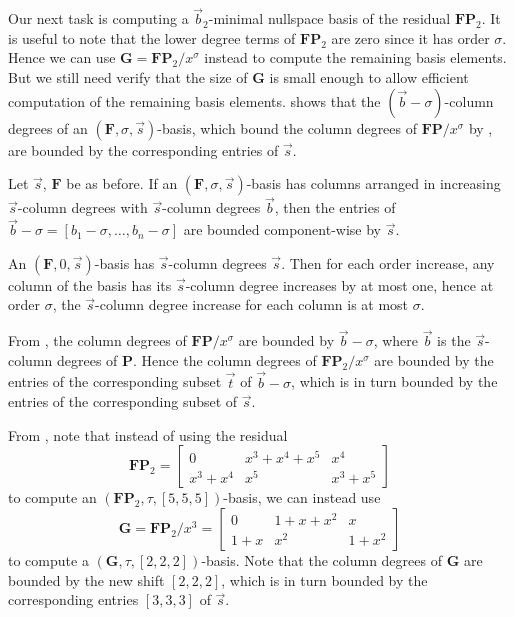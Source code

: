 Our next task is computing a $\vec{b}_{2}$-minimal nullspace basis
of the residual $\mathbf{F}\mathbf{P}_{2}$. It is useful to note
that the lower degree terms of $\mathbf{F}\mathbf{P}_{2}$ are zero
since it has order $\sigma$. Hence we can use $\mathbf{G}=\mathbf{F}\mathbf{P}_{2}/x^{\sigma}$
instead to compute the remaining basis elements. But we still need
verify that the size of $\mathbf{G}$ is small enough to allow efficient
computation of the remaining basis elements. 
shows that the $\left(\vec{b}-\sigma\right)$-column degrees of an
$(\mathbf{F},\sigma,\vec{s})$-basis, which bound the column degrees
of $\mathbf{F}\mathbf{P}/x^{\sigma}$ by ,
are bounded by the corresponding entries of $\vec{s}$.
\begin{lem}
\label{lem:boundOnShiftedDegrees}Let $\vec{s}$, $\mathbf{F}$ be
as before. If an $(\mathbf{F},\sigma,\vec{s})$-basis has columns
arranged in increasing $\vec{s}$-column degrees with $\vec{s}$-column
degrees $\vec{b}$, then the entries of $\vec{b}-\sigma=\left[b_{1}-\sigma,\dots,b_{n}-\sigma\right]$
are bounded component-wise by $\vec{s}$.\end{lem}
\begin{pf}
An $(\mathbf{F},0,\vec{s})$-basis has $\vec{s}$-column degrees $\vec{s}$.
Then for each order increase, any column of the basis has its $\vec{s}$-column
degree increases by at most one, hence at order $\sigma$, the $\vec{s}$-column
degree increase for each column is at most $\sigma$.
\end{pf}
From , the column degrees of $\mathbf{F}\mathbf{P}/x^{\sigma}$
are bounded by $\vec{b}-\sigma$, where $\vec{b}$ is the $\vec{s}$-column
degrees of $\mathbf{P}$. Hence the column degrees of $\mathbf{F}\mathbf{P}_{2}/x^{\sigma}$
are bounded by the entries of the corresponding subset $\vec{t}$
of $\vec{b}-\sigma$, which is in turn bounded by the entries of the
corresponding subset of $\vec{s}$. 
\begin{exmp}
\label{exm:reducingDegree}From ,
note that instead of using the residual 
\[
\mathbf{F}\mathbf{P}_{2}=\left[\begin{array}{ccc}
0 & x^{3}+x^{4}+x^{5} & x^{4}\\
x^{3}+x^{4} & x^{5} & x^{3}+x^{5}
\end{array}\right]
\]
to compute an $\left(\mathbf{F}\mathbf{P}_{2},\tau,[5,5,5]\right)$-basis,
we can instead use 
\[
\mathbf{G}=\mathbf{F}\mathbf{P}_{2}/x^{3}=\left[\begin{array}{ccc}
0 & 1+x+x^{2} & x\\
1+x & x^{2} & 1+x^{2}
\end{array}\right]
\]
 to compute a $\left(\mathbf{G},\tau,[2,2,2]\right)$-basis. Note
that the column degrees of $\mathbf{G}$ are bounded by the new shift
$\left[2,2,2\right]$, which is in turn bounded by the corresponding
entries $\left[3,3,3\right]$ of $\vec{s}$.
\end{exmp}
